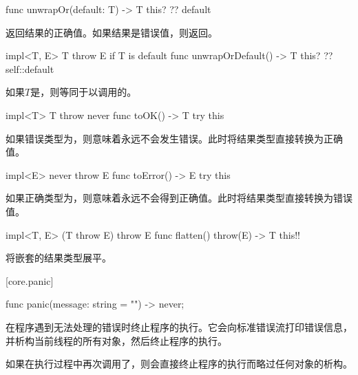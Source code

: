 \begin{itemdecl}
func unwrapOr(default: T) -> T {
    this? ?? default
}
\end{itemdecl}

\pnum
{}返回结果的正确值。如果结果是错误值，则返回。

\begin{itemdecl}
impl<T, E> T throw E if T is default {
    func unwrapOrDefault() -> T {
        this? ?? self::default
    }
}
\end{itemdecl}

\pnum
如果$T$是，则等同于以调用的。

\begin{itemdecl}
impl<T> T throw never {
    func toOK() -> T {
        try this
    }
}
\end{itemdecl}

\pnum
如果错误类型为，则意味着永远不会发生错误。此时将结果类型直接转换为正确值。

\begin{itemdecl}
impl<E> never throw E {
    func toError() -> E {
        try this
    }
}
\end{itemdecl}

\pnum
如果正确类型为，则意味着永远不会得到正确值。此时将结果类型直接转换为错误值。

\begin{itemdecl}
impl<T, E> (T throw E) throw E {
    func flatten() throw(E) -> T {
        this!!
    }
}
\end{itemdecl}

\pnum
{}将嵌套的结果类型展平。

[core.panic]{}

\begin{itemdecl}
func panic(message: string = "") -> never;
\end{itemdecl}

\pnum
{}在程序遇到无法处理的错误时终止程序的执行。它会向标准错误流打印错误信息，并析构当前线程的所有对象，然后终止程序的执行。

\pnum
如果在执行过程中再次调用了，则会直接终止程序的执行而略过任何对象的析构。